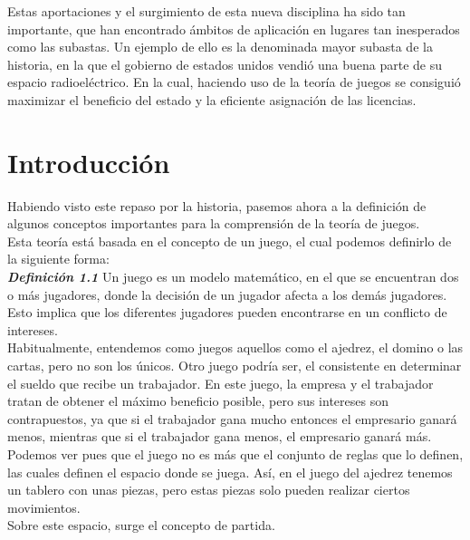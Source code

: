 \documentclass[10pt,a4paper]{book}
\begin{document}
Estas aportaciones y el surgimiento de esta nueva disciplina ha sido tan importante, que han encontrado ámbitos de aplicación en lugares tan inesperados como las subastas. Un ejemplo de ello es la denominada mayor subasta de la historia, en la que el gobierno de estados unidos vendió una buena parte de su espacio radioeléctrico. En la cual, haciendo uso de la teoría de juegos se consiguió maximizar el beneficio del estado y la eficiente asignación de las licencias.\\

	
\chapter{Introducción}	

	
Habiendo visto este repaso por la historia, pasemos ahora a la definición de algunos conceptos importantes para la comprensión de la teoría de juegos.\\

Esta teoría está basada en el concepto de un juego, el cual podemos definirlo de la siguiente forma:\\


\textit{\textbf{Definición 1.1}} Un juego es un modelo matemático, en el que se encuentran dos o más jugadores, donde la decisión de un jugador afecta a los demás jugadores. Esto implica que los diferentes jugadores pueden encontrarse en un conflicto de intereses.\\


Habitualmente, entendemos como juegos aquellos como el ajedrez, el domino o las cartas, pero no son los únicos. Otro juego podría ser, el consistente en determinar el sueldo que recibe un trabajador. En este juego, la empresa y el trabajador tratan de obtener el máximo beneficio posible, pero sus intereses son contrapuestos, ya que si el trabajador gana mucho entonces el empresario ganará menos, mientras que si el trabajador gana menos, el empresario ganará más.\\

Podemos ver pues que el juego no es más que el conjunto de reglas que lo definen, las cuales definen el espacio donde se juega. Así, en el juego del ajedrez tenemos un tablero con unas piezas, pero estas piezas solo pueden realizar ciertos movimientos.\\

Sobre este espacio, surge el concepto de partida. \\\\
\end{document}
